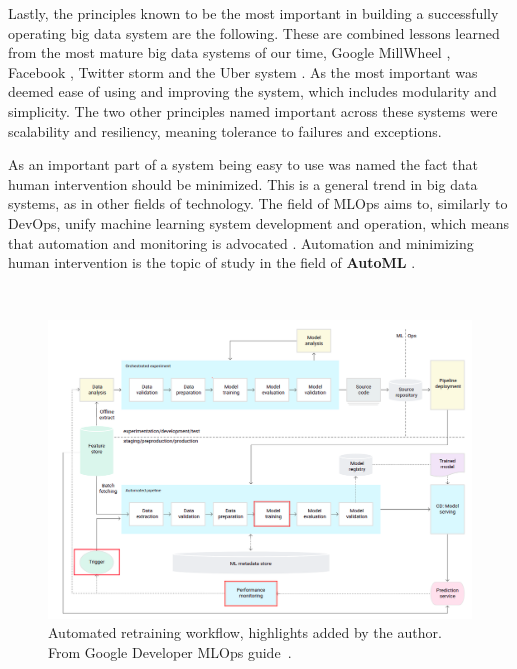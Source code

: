 Lastly, the principles known to be the most important in building a successfully operating big data system are the following. These are combined lessons learned from the most mature big data systems of our time, Google MillWheel \cite{millwheel}, Facebook \cite{facebook}, Twitter storm \cite{storm@twitter} and the Uber system \cite{uber}. As the most important was deemed ease of using and improving the system, which includes modularity and simplicity. The two other principles named important across these systems were scalability and resiliency, meaning tolerance to failures and exceptions. 

As an important part of a system being easy to use was named the fact that human intervention should be minimized. This is a general trend in big data systems, as in other fields of technology. The field of MLOps aims to, similarly to DevOps, unify machine learning system development and operation, which means that automation and monitoring is advocated \cite{googlemlops}. Automation and minimizing human intervention is the topic of study in the field of \textbf{AutoML} \cite{celikAdaptationStrategiesAutomated2021}.

\begin{figure}[ht]
\ \newline
\begin{center}
\includegraphics[width=1.0\columnwidth]{triggergooglemarked.png}
\caption{Automated retraining workflow, highlights added by the author. From Google Developer MLOps guide~\cite{googlemlops}.}
\label{triggerpipeline}
\end{center}
\end{figure}


